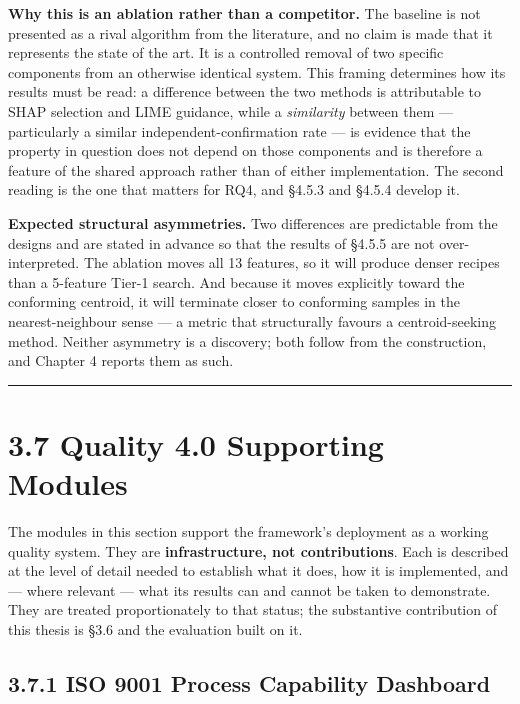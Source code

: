 \textbf{Why this is an ablation rather than a competitor.} The baseline is not presented as a rival algorithm from the literature, and no claim is made that it represents the state of the art. It is a controlled removal of two specific components from an otherwise identical system. This framing determines how its results must be read: a difference between the two methods is attributable to SHAP selection and LIME guidance, while a \emph{similarity} between them --- particularly a similar independent-confirmation rate --- is evidence that the property in question does not depend on those components and is therefore a feature of the shared approach rather than of either implementation. The second reading is the one that matters for RQ4, and §4.5.3 and §4.5.4 develop it.

\textbf{Expected structural asymmetries.} Two differences are predictable from the designs and are stated in advance so that the results of §4.5.5 are not over-interpreted. The ablation moves all 13 features, so it will produce denser recipes than a 5-feature Tier-1 search. And because it moves explicitly toward the conforming centroid, it will terminate closer to conforming samples in the nearest-neighbour sense --- a metric that structurally favours a centroid-seeking method. Neither asymmetry is a discovery; both follow from the construction, and Chapter 4 reports them as such.

\begin{center}\rule{0.5\linewidth}{0.5pt}\end{center}

\hypertarget{quality-4.0-supporting-modules}{%
\section{3.7 Quality 4.0 Supporting Modules}\label{quality-4.0-supporting-modules}}

The modules in this section support the framework's deployment as a working quality system. They are \textbf{infrastructure, not contributions}. Each is described at the level of detail needed to establish what it does, how it is implemented, and --- where relevant --- what its results can and cannot be taken to demonstrate. They are treated proportionately to that status; the substantive contribution of this thesis is §3.6 and the evaluation built on it.

\hypertarget{iso-9001-process-capability-dashboard}{%
\subsection{3.7.1 ISO 9001 Process Capability Dashboard}\label{iso-9001-process-capability-dashboard}}

